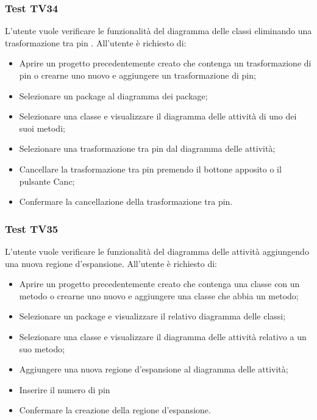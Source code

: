 \documentclass[../PianoDiQualifica.tex]{subfiles}
\begin{document}
	
	\subsubsection{Test TV34} 
	L'utente vuole verificare le funzionalità del diagramma delle classi eliminando una trasformazione tra pin . 
	All'utente è richiesto di: 
	\begin{itemize} 
		\item Aprire un progetto precedentemente creato che contenga un trasformazione di pin o crearne uno nuovo e aggiungere un trasformazione di pin;
		\item Selezionare un package al diagramma dei package; 
		\item Selezionare una classe e visualizzare il diagramma delle attività di uno dei suoi metodi; 
		\item Selezionare una trasformazione tra pin dal diagramma delle attività; 
		\item Cancellare la trasformazione tra pin premendo il bottone apposito o il pulsante Canc; 
		\item Confermare la cancellazione della trasformazione tra pin. 
	\end{itemize} 
	
	
	
	\subsubsection{Test TV35} 
	L'utente vuole verificare le funzionalità del diagramma delle attività aggiungendo una nuova regione d'espansione. 
	All'utente è richiesto di: 
	\begin{itemize} 
		\item Aprire un progetto precedentemente creato che contenga una classe con un metodo o crearne uno nuovo e aggiungere una classe che abbia un metodo;
		\item Selezionare un package e visualizzare il relativo diagramma delle classi; 
		\item Selezionare una classe e visualizzare il diagramma delle attività relativo a un suo metodo; %
		\item Aggiungere una nuova  regione d'espansione al diagramma delle attività; 
		\item Inserire il numero di pin
		\item Confermare la creazione della regione d'espansione.%
	\end{itemize} 
	
\end{document}
